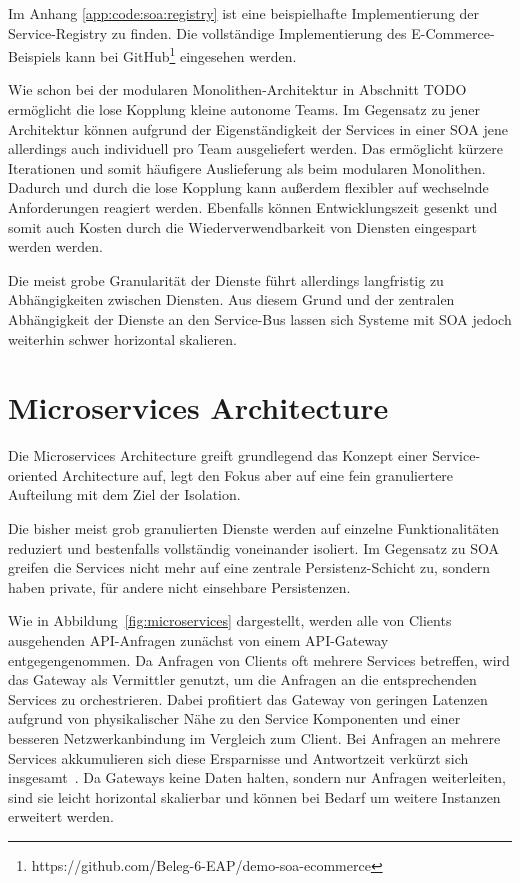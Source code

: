 \documentclass[acmtog]{acmart}
\begin{document}
Im Anhang \ref{app:code:soa:registry} ist eine beispielhafte Implementierung der Service-Registry zu finden.
Die vollständige Implementierung des E-Commerce-Beispiels kann bei GitHub\footnote{https://github.com/Beleg-6-EAP/demo-soa-ecommerce} eingesehen werden.

Wie schon bei der modularen Monolithen-Architektur in Abschnitt TODO ermöglicht die lose Kopplung kleine autonome Teams.
Im Gegensatz zu jener Architektur können aufgrund der Eigenständigkeit der Services in einer SOA jene allerdings auch individuell pro Team ausgeliefert werden.
Das ermöglicht kürzere Iterationen und somit häufigere Auslieferung als beim modularen Monolithen.
Dadurch und durch die lose Kopplung kann außerdem flexibler auf wechselnde Anforderungen reagiert werden.
Ebenfalls können Entwicklungszeit gesenkt und somit auch Kosten durch die Wiederverwendbarkeit von Diensten eingespart werden werden.

Die meist grobe Granularität der Dienste führt allerdings langfristig zu Abhängigkeiten zwischen Diensten.
Aus diesem Grund und der zentralen Abhängigkeit der Dienste an den Service-Bus lassen sich Systeme mit SOA jedoch weiterhin schwer horizontal skalieren.

\section{Microservices Architecture}
\label{sec:microservices}
Die Microservices Architecture greift grundlegend das Konzept einer Service-oriented Architecture auf, legt den Fokus aber auf eine fein granuliertere Aufteilung mit dem Ziel der Isolation.

Die bisher meist grob granulierten Dienste werden auf einzelne Funktionalitäten reduziert und bestenfalls vollständig voneinander isoliert.
Im Gegensatz zu SOA greifen die Services nicht mehr auf eine zentrale Persistenz-Schicht zu, sondern haben private, für andere nicht einsehbare Persistenzen\cite[2]{microservicesArchitecture}.

Wie in Abbildung~\ref{fig:microservices} dargestellt, werden alle von Clients ausgehenden API-Anfragen zunächst von einem API-Gateway entgegengenommen.
Da Anfragen von Clients oft mehrere Services betreffen, wird das Gateway als Vermittler genutzt, um die Anfragen an die entsprechenden Services zu orchestrieren.
Dabei profitiert das Gateway von geringen Latenzen aufgrund von physikalischer Nähe zu den Service Komponenten und einer besseren Netzwerkanbindung im Vergleich zum Client.
Bei Anfragen an mehrere Services akkumulieren sich diese Ersparnisse und Antwortzeit verkürzt sich insgesamt~\cite[30]{architecturePatterns}.
Da Gateways keine Daten halten, sondern nur Anfragen weiterleiten, sind sie leicht horizontal skalierbar und können bei Bedarf um weitere Instanzen erweitert werden.
\end{document}
